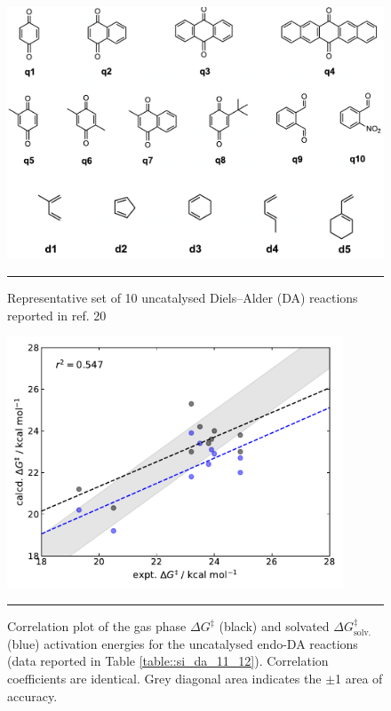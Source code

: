 \documentclass[../../main.tex]{subfiles}
\begin{document}
\begin{figure}[h!]
	\vspace{0.4cm}
	\centering
	\includegraphics[width=15cm]{3/da//figs/figS20}
	\vspace{0.2cm}
	\hrule
	\caption{Representative set of 10 uncatalysed Diels–Alder (DA) reactions reported in ref. 20}
	\label{fig::si_da_20}
\end{figure}



\begin{figure}[h!]
	\vspace{0.4cm}
	\centering
	\includegraphics[width=10cm]{3/da//figs/figS21}
	\vspace{0.2cm}
	\hrule
	\caption{Correlation plot of the gas phase $\Delta G^\ddagger$ (black) and solvated $\Delta G^\ddagger_\text{solv.}$ (blue) activation energies for the uncatalysed endo-DA reactions (data reported in Table \ref{table::si_da_11_12}). Correlation coefficients are identical. Grey diagonal area indicates the $\pm$1 \kcalx area of accuracy.}
	\label{fig::si_da_21}
\end{figure}
\end{document}
